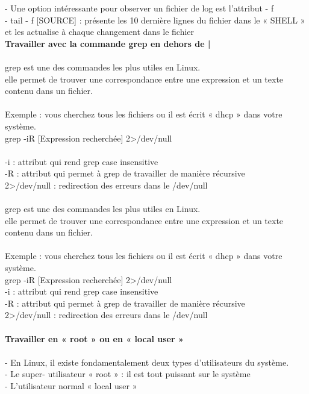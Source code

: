 \documentclass[10pt,a4paper]{article}
\begin{document}
- Une option intéressante pour observer un fichier de log est l’attribut - f \\
- tail - f [SOURCE] : présente les 10 dernière lignes du fichier dans le « SHELL » et les actualise à chaque changement dans le fichier\\
\newpage
{\large\textbf{Travailler avec la commande grep en dehors de |}}\\\\
grep est une des commandes les plus utiles en Linux.  \\
elle permet de trouver une correspondance entre une expression et un texte contenu dans un fichier. \\\\
Exemple : vous cherchez tous les fichiers ou il est écrit « dhcp » dans votre système. \\
grep -iR [Expression recherchée] 2>/dev/null \\\\
-i : attribut qui rend grep case insensitive \\
-R : attribut qui permet à grep de travailler de manière récursive \\
2>/dev/null : redirection des erreurs dans le /dev/null \\\\
grep est une des commandes les plus utiles en Linux.  \\
elle permet de trouver une correspondance entre une expression et un texte contenu dans un fichier. \\\\
Exemple : vous cherchez tous les fichiers ou il est écrit « dhcp » dans votre système. \\grep -iR [Expression recherchée] 2>/dev/null \\
-i : attribut qui rend grep case insensitive \\
-R : attribut qui permet à grep de travailler de manière récursive \\
2>/dev/null : redirection des erreurs dans le /dev/null \\\\
{\large\textbf{Travailler en « root » ou en « local user » }}\\\\
- En Linux, il existe fondamentalement deux types d’utilisateurs du système.\\ 
- Le super- utilisateur « root » : il est tout puissant sur le système \\
- L’utilisateur normal « local user » \\
\end{document}
